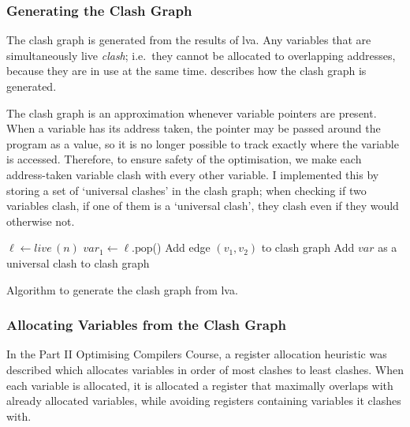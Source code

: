 \documentclass[00-main.tex]{subfiles}
\begin{document}
\subsubsection{Generating the Clash Graph}

The clash graph is generated from the results of \gls{lva}.
Any variables that are simultaneously live \emph{clash}; i.e.\ they cannot be allocated to overlapping addresses, because they are in use at the same time.
 describes how the clash graph is generated.

The clash graph is an approximation whenever variable pointers are present.
When a variable has its address taken, the pointer may be passed around the program as a value, so it is no longer possible to track exactly where the variable is accessed.
Therefore, to ensure safety of the optimisation, we make each address-taken variable clash with every other variable.
I implemented this by storing a set of `universal clashes' in the clash graph; when checking if two variables clash, if one of them is a `universal clash', they clash even if they would otherwise not.

\begin{listing}[h]
  \begin{PseudocodeListing}
    \State $\ell \gets \mathit{live}\,(n)$
      \State $\mathit{var}_1 \gets \ell.\mathrm{pop}$()
        \State Add edge $(v_1, v_2)$ to clash graph
      \EndFor
    \EndWhile
      \State Add $\mathit{var}$ as a universal clash to clash graph
    \EndIf
  \EndFor
  \end{PseudocodeListing}
  \caption{Algorithm to generate the clash graph from \gls{lva}.}
  \label{lst:clash graph generation}
\end{listing}

\subsubsection{Allocating Variables from the Clash Graph}

In the Part II Optimising Compilers Course, a register allocation heuristic was described which allocates variables in order of most clashes to least clashes.
When each variable is allocated, it is allocated a register that maximally overlaps with already allocated variables, while avoiding registers containing variables it clashes with.
\end{document}
